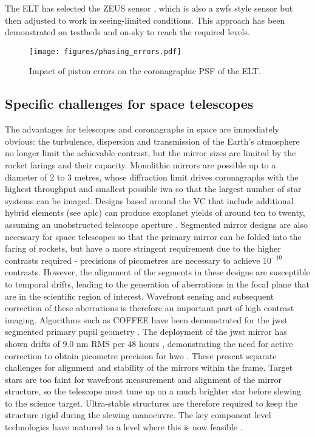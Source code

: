 \documentclass[letterpaper]{ar-1col}
\begin{document}
The ELT has selected the ZEUS sensor \citep{Dohlen06}, which is also a \ac{zwfs} style sensor but then adjusted to work in seeing-limited conditions.
%
This approach has been demonstrated on testbeds \citep{Pfrommer18} and on-sky \citet{Gonte09} to reach the required levels.

\begin{figure}[ht]
  \centering
  \texttt{[image: figures/phasing\_errors.pdf]}
  \caption{Impact of piston errors on the coronagraphic PSF of the ELT.}
  \label{fig:pistonerror}
\end{figure}

\subsection{Specific challenges for space telescopes}

The advantages for telescopes and coronagraphs in space are immediately obvious: the turbulence, dispersion and transmission of the Earth's atmosphere no longer limit the achievable contrast, but the mirror sizes are limited by the rocket farings and their capacity.
%
Monolithic mirrors are possible up to a diameter of 2 to 3 metres, whose diffraction limit drives coronagraphs with the highest throughput and smallest possible \ac{iwa} so that the largest number of star systems can be imaged.
%
Designs based around the VC that include additional hybrid elements (see \ac{aplc}) can produce exoplanet yields of around ten to twenty, assuming an unobstructed telescope aperture \citep{Stark24}.
%
Segmented mirror designs are also necessary for space telescopes so that the primary mirror can be folded into the faring of rockets, but have a more stringent requirement due to the higher contrasts required - precisions of picometres are necessary to achieve $10^{-10}$ contrasts.
%
However, the alignment of the segments in these designs are susceptible to temporal drifts, leading to the generation of aberrations in the focal plane that are in the scientific region of interest.
%
Wavefront sensing and subsequent correction of these aberrations is therefore an important part of high contrast imaging.
%
Algorithms such as COFFEE have been demonstrated for the \ac{jwst} segmented primary pupil geometry \citep{Leboulleux20}.
%
The deployment of the \ac{jwst} mirror has shown drifts of 9.0 nm RMS per 48 hours \citep{Lajoie23}, demonstrating the need for active correction to obtain picometre precision for \ac{hwo} \citep{Laginja22}.
%
These present separate challenges for alignment and stability of the mirrors within the frame.
%
Target stars are too faint for wavefront measurement and alignment of the mirror structure, so the telescope must tune up on a much brighter star before slewing to the science target.
%
Ultra-stable structures are therefore required to keep the structure rigid during the slewing manoeuvre.
%
The key component level technologies have matured to a level where this is now feasible \citep{Coyle21}.
\end{document}
